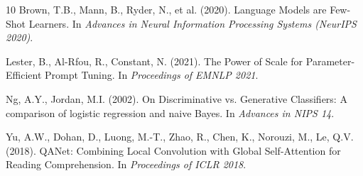 \documentclass[11pt,a4paper]{article}
\begin{document}
\begin{thebibliography}{10}
Brown, T.B., Mann, B., Ryder, N., et al. (2020).
\newblock Language Models are Few-Shot Learners.
\newblock In \emph{Advances in Neural Information Processing Systems (NeurIPS 2020)}.

Lester, B., Al-Rfou, R., Constant, N. (2021).
\newblock The Power of Scale for Parameter-Efficient Prompt Tuning.
\newblock In \emph{Proceedings of EMNLP 2021}.

Ng, A.Y., Jordan, M.I. (2002).
\newblock On Discriminative vs. Generative Classifiers: A comparison of logistic regression and naive Bayes.
\newblock In \emph{Advances in NIPS 14}.

Yu, A.W., Dohan, D., Luong, M.-T., Zhao, R., Chen, K., Norouzi, M., Le, Q.V. (2018).
\newblock QANet: Combining Local Convolution with Global Self-Attention for Reading Comprehension.
\newblock In \emph{Proceedings of ICLR 2018}.

\end{thebibliography}
\end{document}
